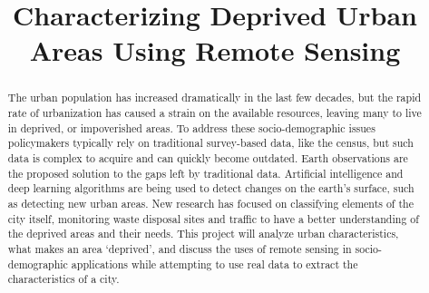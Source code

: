 \documentclass[conference]{IEEEtran}
\begin{document}
	
	\title{Characterizing Deprived Urban Areas Using Remote Sensing}

	\author{
	}

	\maketitle

	\begin{abstract}
		The urban population has increased dramatically in the last few decades, but the rapid rate of urbanization has caused a strain on the available resources, leaving many to live in deprived, or impoverished areas.
		To address these socio-demographic issues policymakers typically rely on traditional survey-based data, like the census, but such data is complex to acquire and can quickly become outdated. Earth observations are the proposed solution to the gaps left by traditional data.
		Artificial intelligence and deep learning algorithms are being used to detect changes on the earth's surface, such as detecting new urban areas.
		New research has focused on classifying elements of the city itself, monitoring waste disposal sites and traffic to have a better understanding of the deprived areas and their needs.
		This project will analyze urban characteristics, what makes an area ‘deprived’, and discuss the uses of remote sensing in socio-demographic applications while attempting to use real data to extract the characteristics of a city.

	\end{abstract}

\end{document}
